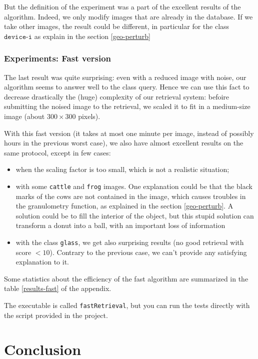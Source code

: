But the definition of the experiment was a part of the excellent results of the algorithm. Indeed, we only modify images that are already in the database. If we take other images, the result could be different, in particular for the class $\texttt{device-i}$ as explain in the section \ref{geo-perturb}

\subsubsection{Experiments: Fast version}

The last result was quite surprising: even with a reduced image with noise, our algorithm seems to answer well to the class query. Hence we can use this fact to decrease drastically the (huge) complexity of our retrieval system: befoire submitting the noised image to the retrieval, we scaled it to fit in a medium-size image (about $300\times300$ pixels).

With this fast version (it takes at most one minute per image, instead of possibly hours in the previous worst case), we also have almost excellent results on the same protocol, except in few cases:
\begin{itemize}
 \item when the scaling factor is too small, which is not a realistic situation;
 \item with some \texttt{cattle} and \texttt{frog} images. One explanation could be that the black marks of the cows are not contained in the image, which causes troubles in the granulometry function, as explained in the section \ref{geo-perturb}. A solution could be to fill the interior of the object, but this stupid solution can transform a donut into a ball, with an important loss of information
 \item with the class \texttt{glass}, we get also surprising results (no good retrieval with score $< 10$). Contrary to the previous case, we can't provide any satisfying explanation to it.
\end{itemize}

Some statistics about the efficiency of the fast algorithm are summarized in the table \ref{results-fast} of the appendix.

The executable is called \texttt{fastRetrieval}, but you can run the tests directly with the script provided in the project.


\section*{Conclusion}

